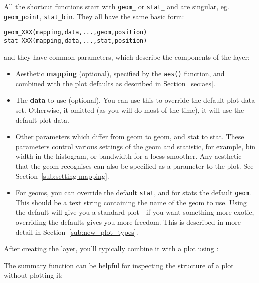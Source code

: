 All the shortcut functions start with {\tt geom\_} or {\tt stat\_} and are singular, eg. {\tt geom\_point}, {\tt stat\_bin}.  They all have the same  basic form:

\begin{alltt}
geom_XXX(mapping, data, ..., geom, position)
stat_XXX(mapping, data, ..., stat, position)
\end{alltt}

\noindent and they have common parameters, which describe the components of the layer:

\begin{itemize}
	\item Aesthetic {\bf mapping} (optional), specified by the {\tt aes()} function, and combined with the plot defaults as described in Section~\ref{sec:aes}.

	\item The {\bf data} to use (optional).  You can use this to override the default plot data set.  Otherwise, it omitted  (as you will do most of the time), it will use the default plot data.
	
	\item Other parameters which differ from geom to geom, and stat to stat.  These parameters control various settings of the geom and statistic, for example, bin width in the histogram, or bandwidth for a loess smoother.  Any aesthetic that the geom recognises can also be specified as a parameter to the plot.  See Section~\ref{sub:setting-mapping}.
	
	\item For geoms, you can override the default {\tt stat}, and for stats the default {\tt geom}.  This should be a text string containing the name of the geom to use.  Using the default will give you a standard plot - if you want something more exotic, overriding the defaults gives you more freedom.  This is described in more detail in Section~\ref{sub:new_plot_types}.
  
\end{itemize}

After creating the layer, you'll typically combine it with a plot using  \code{+}:

% 

\noindent The summary function can be helpful for inspecting the structure of a plot without plotting it:

%

